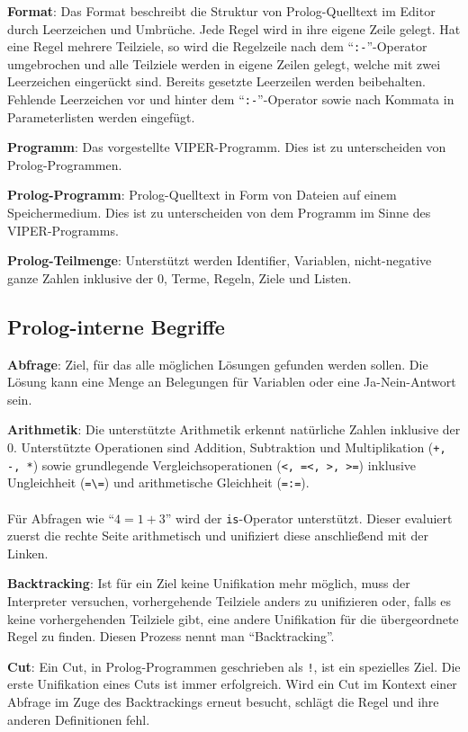 \documentclass[parskip=full,11pt,twoside]{scrartcl}
\begin{document}
\textbf{Format}:
Das Format beschreibt die Struktur von Prolog-Quelltext im Editor durch Leerzeichen und Umbrüche. Jede Regel wird in ihre eigene Zeile gelegt. Hat eine Regel mehrere Teilziele, so wird die Regelzeile nach dem \enquote{\texttt{:-}}-Operator umgebrochen und alle Teilziele werden in eigene Zeilen gelegt, welche mit zwei Leerzeichen eingerückt sind. Bereits gesetzte Leerzeilen werden beibehalten. Fehlende Leerzeichen vor und hinter dem \enquote{\texttt{:-}}-Operator sowie nach Kommata in Parameterlisten werden eingefügt.

\textbf{Programm}:
Das vorgestellte VIPER-Programm. Dies ist zu unterscheiden von Prolog-Programmen.

\textbf{Prolog-Programm}:
Prolog-Quelltext in Form von Dateien auf einem Speichermedium. Dies ist zu unterscheiden von dem Programm im Sinne des VIPER-Programms.

\textbf{Prolog-Teilmenge}:
Unterstützt werden Identifier, Variablen, nicht-negative ganze Zahlen inklusive der 0, Terme, Regeln, Ziele und Listen.

\subsection{Prolog-interne Begriffe}
\textbf{Abfrage}:
Ziel, für das alle möglichen Lösungen gefunden werden sollen. Die Lösung kann eine Menge an Belegungen für Variablen oder eine Ja-Nein-Antwort sein.

\textbf{Arithmetik}:
Die unterstützte Arithmetik erkennt natürliche Zahlen inklusive der 0. Unterstützte Operationen sind Addition, Subtraktion und Multiplikation (\texttt{+, -, *}) sowie grundlegende Vergleichsoperationen (\texttt{<, =<, >, >=}) inklusive Ungleichheit (\texttt{=\textbackslash=}) und arithmetische Gleichheit (\texttt{=:=}).\\\\Für Abfragen wie \enquote{$4 = 1 + 3$} wird der \texttt{is}-Operator unterstützt. Dieser evaluiert zuerst die rechte Seite arithmetisch und unifiziert diese anschließend mit der Linken.

\textbf{Backtracking}:
Ist für ein Ziel keine Unifikation mehr möglich, muss der Interpreter versuchen, vorhergehende Teilziele anders zu unifizieren oder, falls es keine vorhergehenden Teilziele gibt, eine andere Unifikation für die übergeordnete Regel zu finden.
Diesen Prozess nennt man \enquote{Backtracking}.

\textbf{Cut}:
Ein Cut, in Prolog-Programmen geschrieben als \texttt{!}, ist ein spezielles Ziel.
Die erste Unifikation eines Cuts ist immer erfolgreich.
Wird ein Cut im Kontext einer Abfrage im Zuge des Backtrackings erneut besucht, schlägt die Regel und ihre anderen Definitionen fehl.
\end{document}
